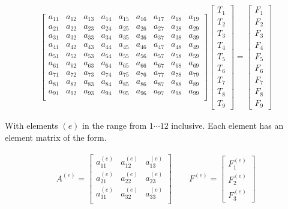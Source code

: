 \documentclass[9pt]{amsart}
\begin{document}
\begin{align*}
  \begin{bmatrix}
    a_{11} & a_{12} & a_{13} & a_{14} & a_{15} & a_{16} & a_{17} & a_{18} & a_{19} \\
    a_{21} & a_{22} & a_{23} & a_{24} & a_{25} & a_{26} & a_{27} & a_{28} & a_{29} \\
    a_{31} & a_{32} & a_{33} & a_{34} & a_{35} & a_{36} & a_{37} & a_{38} & a_{39} \\
    a_{41} & a_{42} & a_{43} & a_{44} & a_{45} & a_{46} & a_{47} & a_{48} & a_{49} \\
    a_{51} & a_{52} & a_{53} & a_{54} & a_{55} & a_{56} & a_{57} & a_{58} & a_{59} \\
    a_{61} & a_{62} & a_{63} & a_{64} & a_{65} & a_{66} & a_{67} & a_{68} & a_{69} \\
    a_{71} & a_{72} & a_{73} & a_{74} & a_{75} & a_{76} & a_{77} & a_{78} & a_{79} \\
    a_{81} & a_{82} & a_{83} & a_{84} & a_{85} & a_{86} & a_{87} & a_{88} & a_{89} \\
    a_{91} & a_{92} & a_{93} & a_{94} & a_{95} & a_{96} & a_{97} & a_{98} & a_{99} \\
  \end{bmatrix}
  \begin{bmatrix}
    T_1 \\ T_2 \\ T_3 \\ T_4 \\ T_5 \\ T_6 \\ T_7 \\ T_8 \\ T_9
  \end{bmatrix}=
  \begin{bmatrix}
    F_1 \\ F_2 \\ F_3 \\ F_4 \\ F_5 \\ F_6 \\ F_7 \\ F_8 \\ F_9
  \end{bmatrix}
\end{align*}

With elements \((e)\) in the range from \(1\cdots12\) inclusive. Each element has an element matrix of the form.

\begin{align*}
  A^{(e)}=
  \begin{bmatrix}
    a_{11}^{(e)} & a_{12}^{(e)} & a_{13}^{(e)} \\
    a_{21}^{(e)} & a_{22}^{(e)} & a_{23}^{(e)} \\
    a_{31}^{(e)} & a_{32}^{(e)} & a_{33}^{(e)} \\
  \end{bmatrix}
  \quad\quad
  F^{(e)}=
  \begin{bmatrix}
    F_1^{(e)} \\ F_2^{(e)} \\ F_3^{(e)}
  \end{bmatrix}
\end{align*}
\end{document}
